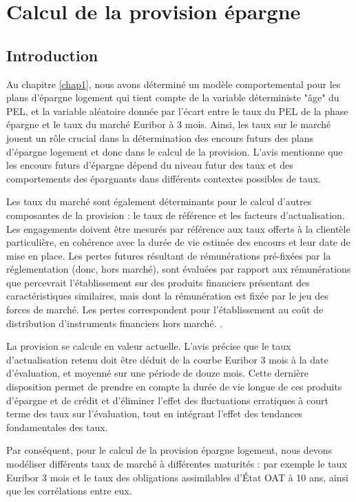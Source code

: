 \documentclass[12pt, a4paper]{book}
\begin{document}
\chapter{Calcul de la provision épargne}
\label{chap2}
\section{Introduction}
Au chapitre \ref{chap1}, nous avons déterminé un modèle comportemental pour les plans d'épargne logement qui tient compte de la variable déterministe "âge" du PEL, et la variable aléatoire donnée par l'écart entre le taux du PEL de la phase épargne et le taux du marché Euribor à 3 mois. Ainsi, les taux sur le marché jouent un rôle crucial dans la détermination des encours futurs des plans d'épargne logement et donc dans le calcul de la provision. L'avis \cite{CNC1} mentionne que les encours futurs d'épargne  dépend du niveau futur des taux et des comportements des épargnants dans différents contextes possibles de taux.

Les taux du marché sont également déterminants pour le calcul d'autres composantes de la provision : le taux de référence et les facteurs d'actualisation. Les engagements doivent être mesurés par référence aux taux offerts à la clientèle particulière, en cohérence avec la durée de vie estimée des encours et leur date de mise en place. Les pertes futures résultant de rémunérations pré-fixées par la réglementation (donc, hors marché), sont évaluées par rapport aux rémunérations que percevrait l'établissement sur des produits financiers présentant des caractéristiques similaires, mais dont la rémunération est fixée par le jeu des forces de marché. Les pertes correspondent pour l'établissement au coût de distribution d'instruments financiers hors marché. \cite{CNC2}.

La provision se calcule en valeur actuelle. L'avis \cite{CNC1} précise que le taux d'actualisation retenu doit être déduit de la courbe Euribor 3 mois à la date d’évaluation, et moyenné sur une période de douze mois. Cette dernière disposition permet de prendre en compte la durée de vie longue de ces produits d'épargne et de crédit et d'éliminer l'effet des fluctuations erratiques à court terme des taux sur l'évaluation, tout en intégrant l'effet des tendances fondamentales des taux.

Par conséquent, pour le calcul de la provision épargne logement, nous devons modéliser différents taux de marché à différentes maturités : par exemple le taux Euribor 3 mois et le taux des obligations assimilables d'État OAT à 10 ans, ainsi que les corrélations entre eux.
\end{document}
